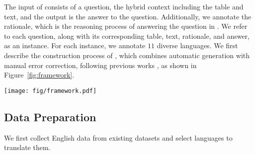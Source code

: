 The input of \ourdataset consists of a question, the hybrid context including the table and text, and the output is the answer to the question. 
Additionally, we annotate the rationale, which is the reasoning process of answering the question in \ourdataset. 
We refer to each question, along with its corresponding table, text, rationale, and answer, as an instance. 
For each instance, we annotate $11$ diverse languages.
We first describe the construction process of \ourdataset, which combines automatic generation with manual error correction, following previous works \cite{peng-etal-2024-humanevalxl,singh-etal-2024-indicgenbench,MultiSpider}, as shown in Figure~\ref{fig:framework}.

\begin{figure*}
    \centering
    \texttt{[image: fig/framework.pdf]}
    \caption{
    The process of constructing \ourdataset.
    The \colorbox{data_blue_light}{} boxes represent the data, and the white solid boxes represent the construction steps.
    }
    \label{fig:framework}
\end{figure*}

\begin{table*}[t]
    \centering
    \small
    
    \caption{
    The distribution of English data, including answer types and answer sources in \ourdataset, sourced from three mainstream datasets.
    The listed answer types are the all answer types corresponding to each dataset.
    }
    \label{tab:answer_statistics}
\end{table*}


\subsection{Data Preparation}
We first collect English data from existing datasets and select languages to translate them.

